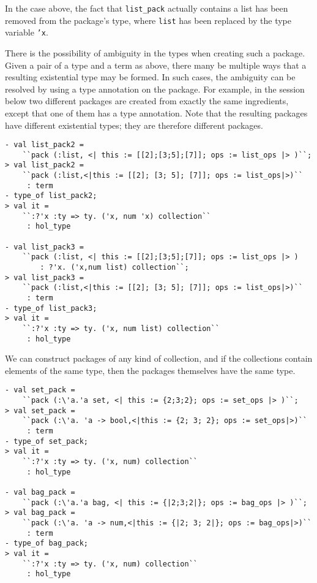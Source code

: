 In the case above, the fact that \texttt{list\_pack} actually contains a list has been removed
from the package's type, where \texttt{list} has been replaced by the type variable
\texttt{'x}.

There is the possibility of ambiguity in the types when creating such a package.
Given a pair of a type and a term as above, there many be multiple ways that a resulting
existential type may be formed.
In such cases, the ambiguity can be resolved by using a type annotation on the package.
For example, in the session below two different packages are created from exactly the same
ingredients, except that one of them has a type annotation.  Note that the resulting
packages have different existential types; they are therefore different packages.
\begin{session}
\begin{verbatim}
- val list_pack2 =
    ``pack (:list, <| this := [[2];[3;5];[7]]; ops := list_ops |> )``;
> val list_pack2 =
    ``pack (:list,<|this := [[2]; [3; 5]; [7]]; ops := list_ops|>)``
     : term
- type_of list_pack2;
> val it =
    ``:?'x :ty => ty. ('x, num 'x) collection``
     : hol_type

- val list_pack3 =
    ``pack (:list, <| this := [[2];[3;5];[7]]; ops := list_ops |> )
        : ?'x. ('x,num list) collection``;
> val list_pack3 =
    ``pack (:list,<|this := [[2]; [3; 5]; [7]]; ops := list_ops|>)``
     : term
- type_of list_pack3;
> val it =
    ``:?'x :ty => ty. ('x, num list) collection``
     : hol_type
\end{verbatim}
\end{session}

We can construct packages of any kind of collection,
and if the collections contain elements of the same type, then
the packages themselves have the same type.
\begin{session}
\begin{verbatim}
- val set_pack =
    ``pack (:\'a.'a set, <| this := {2;3;2}; ops := set_ops |> )``;
> val set_pack =
    ``pack (:\'a. 'a -> bool,<|this := {2; 3; 2}; ops := set_ops|>)``
     : term
- type_of set_pack;
> val it =
    ``:?'x :ty => ty. ('x, num) collection``
     : hol_type

- val bag_pack =
    ``pack (:\'a.'a bag, <| this := {|2;3;2|}; ops := bag_ops |> )``;
> val bag_pack =
    ``pack (:\'a. 'a -> num,<|this := {|2; 3; 2|}; ops := bag_ops|>)``
     : term
- type_of bag_pack;
> val it =
    ``:?'x :ty => ty. ('x, num) collection``
     : hol_type
\end{verbatim}
\end{session}


